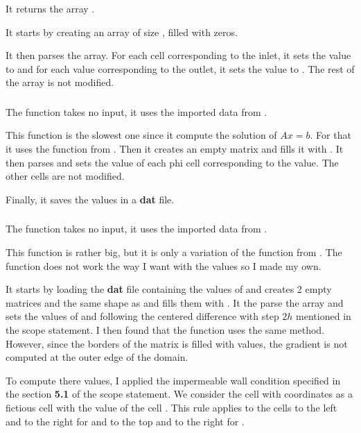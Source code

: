 It returns the array .

It starts by creating an array  of size
, filled with zeros.

It then parses the array. For each cell corresponding to the inlet, it sets the
value to  and for each value corresponding to the outlet, it sets
the value to . The rest of the array is not modified.

\subsubsection{\textcolor{func}{}}
The function \textcolor{func}{} takes no input, it uses the
imported data from .

This function is the slowest one since it compute the solution of $Ax = b$. For
that it uses the function  from . Then it creates
an empty matrix  and fills it with . It then parses
 and sets the value of each phi cell corresponding to the  value.
The other cells are not modified.

Finally, it saves the values in a \textbf{dat} file.

\subsubsection{\textcolor{func}{}}
The function \textcolor{func}{} takes no input, it uses the imported data
from .

This function is rather big, but it is only a variation of the 
function from . The function  does not work
the way I want with the  values so I made my own.

It starts by loading the \textbf{dat} file containing the values of 
and creates 2 empty matrices  and  the same shape as
 and fills them with . It the parse the 
array and sets the values of  and  following the centered
difference with step $2h$ mentioned in the scope statement. I then found that
the function  uses the same method. However, since the
borders of the matrix  is filled with  values, the
gradient is not computed at the outer edge of the domain.

To compute there values, I applied the impermeable wall condition specified in
the section \textbf{5.1} of the scope statement. We consider the 
 cell with coordinates \py{[i - 1, j]} as a fictious cell with
the value of the cell \py{[i, j]}. This rule applies to the cells to the left
and to the right for  and to the top and to the right for
.

